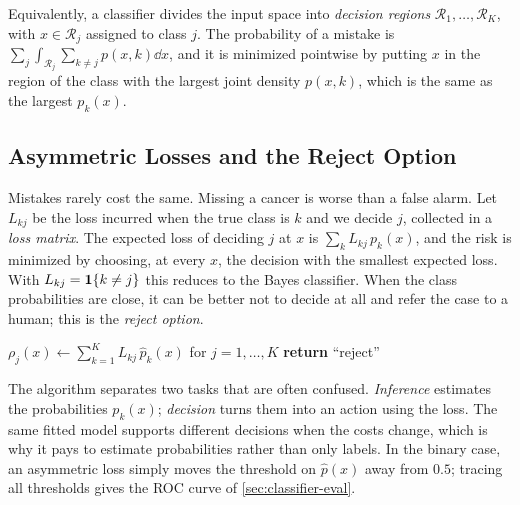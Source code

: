Equivalently, a classifier divides the input space into \emph{decision regions} $\mathcal{R}_1,\dots,\mathcal{R}_K$, with $x\in\mathcal{R}_j$ assigned to class $j$. The probability of a mistake is $\sum_j\int_{\mathcal{R}_j}\sum_{k\ne j}p(x,k)\dd x$, and it is minimized pointwise by putting $x$ in the region of the class with the largest joint density $p(x,k)$, which is the same as the largest $p_k(x)$.

\subsection{Asymmetric Losses and the Reject Option}

Mistakes rarely cost the same. Missing a cancer is worse than a false alarm. Let $L_{kj}$ be the loss incurred when the true class is $k$ and we decide $j$, collected in a \emph{loss matrix}. The expected loss of deciding $j$ at $x$ is $\sum_kL_{kj}\,p_k(x)$, and the risk is minimized by choosing, at every $x$, the decision with the smallest expected loss. With $L_{kj}=\mathbf{1}\{k\ne j\}$ this reduces to the Bayes classifier. When the class probabilities are close, it can be better not to decide at all and refer the case to a human; this is the \emph{reject option}.

\begin{algorithm}[H]
\caption{Plug-in Bayes Decision Rule}\label{alg:bayes-decision}
\begin{algorithmic}[1]
\State $\rho_j(x)\gets\sum_{k=1}^KL_{kj}\,\hat p_k(x)$ for $j=1,\dots,K$ 
  \State \textbf{return} ``reject''
\EndIf
{}
\end{algorithmic}
\end{algorithm}

The algorithm separates two tasks that are often confused. \emph{Inference} estimates the probabilities $p_k(x)$; \emph{decision} turns them into an action using the loss. The same fitted model supports different decisions when the costs change, which is why it pays to estimate probabilities rather than only labels. In the binary case, an asymmetric loss simply moves the threshold on $\hat p(x)$ away from $0.5$; tracing all thresholds gives the ROC curve of \cref{sec:classifier-eval}.

